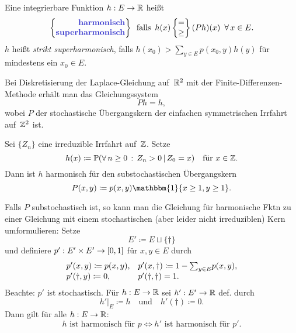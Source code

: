 \documentclass{cheat-sheet}
\renewcommand{\P}{\mathbb{P}} %
\newcommand{\ind}{\mathbbm{1}} %
\begin{document}
\begin{defn}
  Eine integrierbare Funktion $h : E \to \mathbb{R}$ heißt
  \[
    \arraycolsep=0pt
    \left\{ \begin{array}{r}
      \text{\emph{harmonisch}} \\
      \text{\emph{superharmonisch}}
    \end{array} \right\}
    \enspace \text{falls} \enspace
    h(x)
    \left\{ \begin{array}{c}
      = \\
      \geq
    \end{array} \right\}
    (P h)(x)
    \enspace \forall \, x \in E.
  \]
  $h$ heißt \textit{strikt superharmonisch}, falls $h(x_0) > {\sum}_{y \in E} p(x_0, y) h(y)$ für mindestens ein $x_0 \in E$.
\end{defn}

\begin{bsp}
  Bei Diskretisierung der Laplace-Gleichung auf~$\mathbb{R}^2$ mit der Finite-Differenzen-Methode erhält man das Gleichungssystem
  \[ P h = h, \]
  wobei $P$ der stochastische Übergangskern der einfachen symmetrischen Irrfahrt auf~$\mathbb{Z}^2$ ist.
\end{bsp}

\begin{bsp}
  Sei $\{ Z_n \}$ eine irreduzible Irrfahrt auf~$\mathbb{Z}$.
  Setze
  \[
    h(x) \coloneqq \P(\fa{n \geq 0} Z_n > 0 \,|\, Z_0 = x)
    \quad \text{für } x \in \Z.
  \]
  Dann ist $h$ harmonisch für den substochastischen Übergangskern
  \[
    P(x, y) \coloneqq p(x, y) \ind \{ x \geq 1, y \geq 1 \}.
  \]
\end{bsp}

\begin{verf}
  Falls $P$ substochastisch ist, so kann man die Gleichung für harmonische Fktn zu einer Gleichung mit einem stochastischen (aber leider nicht irreduziblen) Kern umformulieren: Setze
  \[ E' \coloneqq E \sqcup \{ \dag \} \]
  und definiere $p' : E' \times E' \to \left[ 0, 1 \right]$ für $x, y \in E$ durch
  \[
    \begin{array}{l l}
      p'(x, y) \coloneqq p(x, y),
      & p'(x, \dag) \coloneqq 1 - {\sum}_{y \in E} p(x, y), \\
      p'(\dag, y) \coloneqq 0,
      & p'(\dag, \dag) = 1.
    \end{array}
  \]
  Beachte: $p'$ ist stochastisch.
  Für $h : E \to \mathbb{R}$ sei $h' : E' \to \mathbb{R}$ def. durch
  \[
    h'|_E \coloneqq h
    \quad \text{und} \quad
    h'(\dag) \coloneqq 0.
  \]
  Dann gilt für alle $h : E \to \mathbb{R}$:
  \[
    \text{$h$ ist harmonisch für $p$} \iff
    \text{$h'$ ist harmonisch für $p'$.}
  \]
\end{verf}
\end{document}
